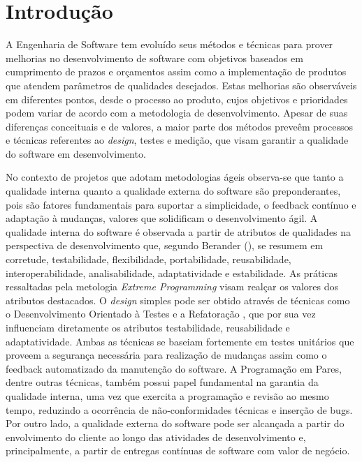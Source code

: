 \chapter{Introdução}
\label{cap-introducao}

A Engenharia de Software tem evoluído seus métodos e técnicas para prover melhorias no desenvolvimento de software com objetivos baseados em cumprimento de prazos e orçamentos assim como a implementação de produtos que atendem parâmetros de qualidades desejados. Estas melhorias são observáveis em diferentes pontos, desde o processo ao produto, cujos objetivos e prioridades podem variar de acordo com a metodologia de desenvolvimento. Apesar de suas diferenças conceituais e de valores, a maior parte dos métodos preveêm processos e técnicas referentes ao \emph{design}, testes e medição, que visam garantir a qualidade do software em desenvolvimento.

%

No contexto de projetos que adotam metodologias ágeis observa-se que tanto a qualidade interna quanto a qualidade externa do software são preponderantes, pois são fatores fundamentais para suportar a simplicidade, o feedback contínuo e adaptação à mudanças, valores que solidificam o desenvolvimento ágil. A qualidade interna do software é observada a partir de atributos de qualidades na perspectiva de desenvolvimento que, segundo Berander (\citeyear{berander2005}), se resumem em corretude, testabilidade, flexibilidade, portabilidade, reusabilidade, interoperabilidade, analisabilidade, adaptatividade e estabilidade. As práticas ressaltadas pela metologia \emph{Extreme Programming} \cite{beck2000} visam realçar os valores dos atributos destacados. O \emph{design} simples pode ser obtido através de técnicas como o Desenvolvimento Orientado à Testes \cite{beck2002} e a Refatoração \cite{fowler1999}, que por sua vez influenciam diretamente os atributos testabilidade, reusabilidade e adaptatividade. Ambas as técnicas se baseiam fortemente em testes unitários que proveem a segurança necessária para realização de mudanças assim como o feedback automatizado da manutenção do software. A Programação em Pares, dentre outras técnicas, também possui papel fundamental na garantia da qualidade interna, uma vez que exercita a programação e revisão ao mesmo tempo, reduzindo a ocorrência de não-conformidades técnicas e inserção de bugs. Por outro lado, a qualidade externa do software pode ser alcançada a partir do envolvimento do cliente ao longo das atividades de desenvolvimento e, principalmente, a partir de entregas contínuas de software com valor de negócio.

